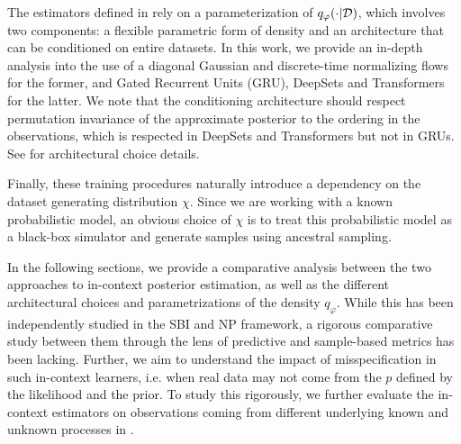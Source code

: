 The estimators defined in  rely on a parameterization of $q_\varphi(\cdot | {\mathcal{D}})$, which involves two components: a flexible parametric form of density and an architecture that can be conditioned on entire datasets. In this work, we provide an in-depth analysis into the use of a diagonal Gaussian and discrete-time normalizing flows for the former, and Gated Recurrent Units (GRU), DeepSets and Transformers for the latter. We note that the conditioning architecture should respect permutation invariance of the approximate posterior to the ordering in the observations, 
which is respected in DeepSets and Transformers but not in GRUs. See  for architectural choice details.

Finally, these training procedures naturally introduce a dependency on the dataset generating distribution $\chi$. Since we are working with a known probabilistic model, an obvious choice of $\chi$ is to treat this probabilistic model as a black-box simulator and generate samples using ancestral sampling.

In the following sections, we provide a comparative analysis between the two approaches to in-context posterior estimation, as well as the different architectural choices and parametrizations of the density $q_\varphi$. While this has been independently studied in the SBI and NP framework, a rigorous comparative study between them through the lens of predictive and sample-based metrics has been lacking. Further, we aim to understand the impact of misspecification in such in-context learners, i.e. when real data may not come from the $p$ defined by the likelihood and the prior. To study this rigorously, we further evaluate the in-context estimators on observations coming from different underlying known and unknown processes in .